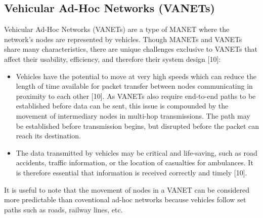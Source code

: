 \documentclass{article}
\begin{document}
\subsection{Vehicular Ad-Hoc Networks (VANETs)}
Vehicular Ad-Hoc Networks (VANETs) are a type of MANET where the network's nodes are represented by vehicles. Though MANETs and VANETs share many characteristics, there are unique challenges exclusive to VANETs that affect their usability, efficiency, and therefore their system design [10]:
\begin{itemize}
	\item Vehicles have the potential to move at very high speeds which can reduce the length of time available for packet transfer between nodes communicating in proximity to each other [10]. As VANETs also require end-to-end paths to be established before data can be sent, this issue is compounded by the movement of intermediary nodes in multi-hop transmissions. The path may be established before transmission begins, but disrupted before the packet can reach its destination.
	\item The data transmitted by vehicles may be critical and life-saving, such as road accidents, traffic information, or the location of casualties for ambulances. It is therefore essential that information is received correctly and timely [10].
\end{itemize}
It is useful to note that the movement of nodes in a VANET can be considered more predictable than coventional ad-hoc networks because vehicles follow set paths such as roads, railway lines, etc.
\end{document}
